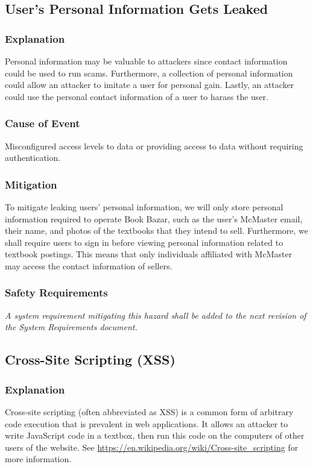 \documentclass[fullpage]{article}
\begin{document}
\subsection{User's Personal Information Gets Leaked}

\subsubsection*{Explanation}
Personal information may be valuable to attackers since contact information could be used to run scams. Furthermore, a collection of personal information could allow an attacker to imitate a user for personal gain. Lastly, an attacker could use the personal contact information of a user to harass the user.

\subsubsection*{Cause of Event}
Misconfigured access levels to data or providing access to data without requiring authentication.

\subsubsection*{Mitigation}
To mitigate leaking users’ personal information, we will only store personal information required to operate Book Bazar, such as the user’s McMaster email, their name, and photos of the textbooks that they intend to sell. Furthermore, we shall require users to sign in before viewing personal information related to textbook postings. This means that only individuals affiliated with McMaster may access the contact information of sellers.

\subsubsection*{Safety Requirements}
\emph{A system requirement mitigating this hazard shall be added to the next revision of the System Requirements document.}

\subsection{Cross-Site Scripting (XSS)}

\subsubsection*{Explanation}
Cross-site scripting (often abbreviated as XSS) is a common form of arbitrary code execution that is prevalent in web applications. It allows an attacker to write JavaScript code in a textbox, then run this code on the computers of other users of the website. See \url{https://en.wikipedia.org/wiki/Cross-site_scripting}  for more information.
\end{document}
